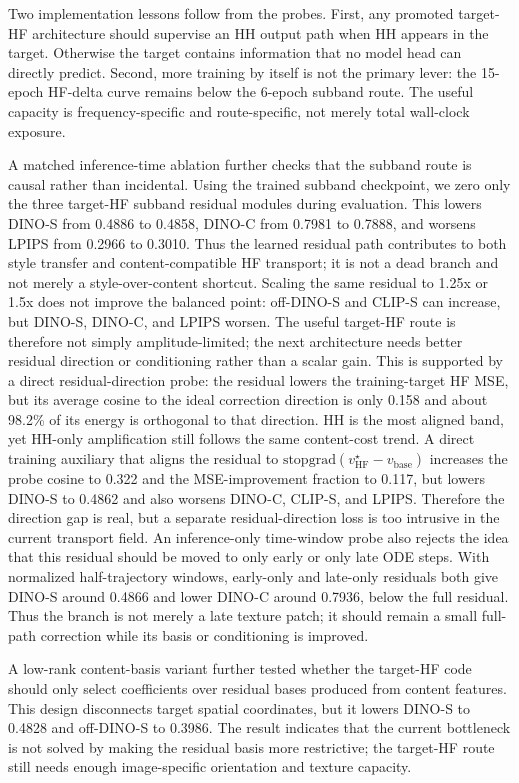 \documentclass[10pt,twocolumn]{article}
\newcommand{\dinos}{DINO-S}
\newcommand{\dinoc}{DINO-C}
\newcommand{\clips}{CLIP-S}
\begin{document}
Two implementation lessons follow from the probes. First, any promoted target-HF
architecture should supervise an HH output path when HH appears in the target. Otherwise
the target contains information that no model head can directly predict. Second, more
training by itself is not the primary lever: the 15-epoch HF-delta curve remains below
the 6-epoch subband route. The useful capacity is frequency-specific and route-specific,
not merely total wall-clock exposure.

A matched inference-time ablation further checks that the subband route is causal rather
than incidental. Using the trained subband checkpoint, we zero only the three target-HF
subband residual modules during evaluation. This lowers \dinos{} from 0.4886 to 0.4858,
\dinoc{} from 0.7981 to 0.7888, and worsens LPIPS from 0.2966 to 0.3010. Thus the
learned residual path contributes to both style transfer and content-compatible HF
transport; it is not a dead branch and not merely a style-over-content shortcut.
Scaling the same residual to 1.25x or 1.5x does not improve the balanced point:
off-\dinos{} and \clips{} can increase, but \dinos{}, \dinoc{}, and LPIPS worsen.
The useful target-HF route is therefore not simply amplitude-limited; the next
architecture needs better residual direction or conditioning rather than a scalar gain.
This is supported by a direct residual-direction probe: the residual lowers the
training-target HF MSE, but its average cosine to the ideal correction direction is only
0.158 and about 98.2\% of its energy is orthogonal to that direction. HH is the most
aligned band, yet HH-only amplification still follows the same content-cost trend.
A direct training auxiliary that aligns the residual to
\(\mathrm{stopgrad}(v^\star_{\mathrm{HF}}-v_{\mathrm{base}})\) increases the
probe cosine to 0.322 and the MSE-improvement fraction to 0.117, but lowers
\dinos{} to 0.4862 and also worsens \dinoc{}, \clips{}, and LPIPS. Therefore the
direction gap is real, but a separate residual-direction loss is too intrusive in the
current transport field.
An inference-only time-window probe also rejects the idea that this residual should
be moved to only early or only late ODE steps. With normalized half-trajectory windows,
early-only and late-only residuals both give \dinos{} around 0.4866 and lower
\dinoc{} around 0.7936, below the full residual. Thus the branch is not merely a late
texture patch; it should remain a small full-path correction while its basis or
conditioning is improved.

A low-rank content-basis variant further tested whether the target-HF code should only
select coefficients over residual bases produced from content features. This design
disconnects target spatial coordinates, but it lowers \dinos{} to 0.4828 and
off-\dinos{} to 0.3986. The result indicates that the current bottleneck is not solved
by making the residual basis more restrictive; the target-HF route still needs enough
image-specific orientation and texture capacity.
\end{document}
